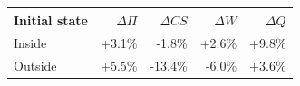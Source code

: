 \begin{tabular}{lrrrr}\toprule
Initial state & $\Delta\Pi$ & $\Delta CS$ & $\Delta W$ & $\Delta Q$\\\midrule
Inside & +3.1\% & -1.8\% & +2.6\% & +9.8\% \\
Outside & +5.5\% & -13.4\% & -6.0\% & +3.6\% \\
\bottomrule\end{tabular}

